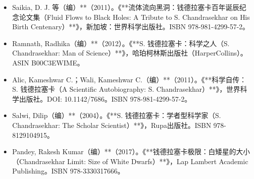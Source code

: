 \begin{itemize}
\item Saikia, D. J. 等（编）**（2011）。《**流体流向黑洞：钱德拉塞卡百年诞辰纪念论文集（Fluid Flows to Black Holes: A Tribute to S. Chandrasekhar on His Birth Centenary）**》，新加坡：世界科学出版社。ISBN 978-981-4299-57-2。
\item Ramnath, Radhika（编）**（2012）。《**S. 钱德拉塞卡：科学之人（S. Chandrasekhar: Man of Science）**》，哈珀柯林斯出版社（HarperCollins）。ASIN B00C3EWIME。
\item Alic, Kameshwar C.；Wali, Kameshwar C.（编）**（2011）。《**科学自传：S. 钱德拉塞卡（A Scientific Autobiography: S. Chandrasekhar）**》，世界科学出版社。DOI: 10.1142/7686。ISBN 978-981-4299-57-2。
\item Salwi, Dilip（编）**（2004）。《**S. 钱德拉塞卡：学者型科学家（S. Chandrasekhar: The Scholar Scientist）**》，Rupa出版社。ISBN 978-8129104915。
\item Pandey, Rakesh Kumar（编）**（2017）。《**钱德拉塞卡极限：白矮星的大小（Chandrasekhar Limit: Size of White Dwarfs）**》，Lap Lambert Academic Publishing。ISBN 978-3330317666。
\end{itemize}
